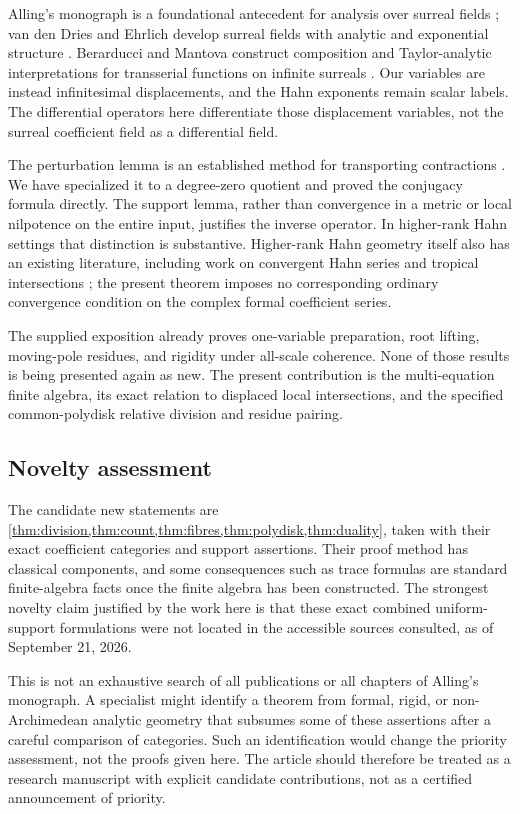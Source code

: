 \documentclass[11pt,letterpaper]{article}
\theoremstyle{definition}
\theoremstyle{remark}
\numberwithin{equation}{section}
\begin{document}
Alling's monograph is a foundational antecedent for analysis over surreal fields \cite{Alling}; van den Dries and Ehrlich develop surreal fields with analytic and exponential structure \cite{vdDE}. Berarducci and Mantova construct composition and Taylor-analytic interpretations for transserial functions on infinite surreals \cite{BM}. Our variables are instead infinitesimal displacements, and the Hahn exponents remain scalar labels. The differential operators here differentiate those displacement variables, not the surreal coefficient field as a differential field.

The perturbation lemma is an established method for transporting contractions \cite{Crainic}. We have specialized it to a degree-zero quotient and proved the conjugacy formula directly. The support lemma, rather than convergence in a metric or local nilpotence on the entire input, justifies the inverse operator. In higher-rank Hahn settings that distinction is substantive. Higher-rank Hahn geometry itself also has an existing literature, including work on convergent Hahn series and tropical intersections \cite{JoswigSmith}; the present theorem imposes no corresponding ordinary convergence condition on the complex formal coefficient series.

The supplied exposition \cite{Prior} already proves one-variable preparation, root lifting, moving-pole residues, and rigidity under all-scale coherence. None of those results is being presented again as new. The present contribution is the multi-equation finite algebra, its exact relation to displaced local intersections, and the specified common-polydisk relative division and residue pairing.

\subsection{Novelty assessment}
The candidate new statements are \cref{thm:division,thm:count,thm:fibres,thm:polydisk,thm:duality}, taken with their exact coefficient categories and support assertions. Their proof method has classical components, and some consequences such as trace formulas are standard finite-algebra facts once the finite algebra has been constructed. The strongest novelty claim justified by the work here is that these exact combined uniform-support formulations were not located in the accessible sources consulted, as of September 21, 2026.

This is not an exhaustive search of all publications or all chapters of Alling's monograph. A specialist might identify a theorem from formal, rigid, or non-Archimedean analytic geometry that subsumes some of these assertions after a careful comparison of categories. Such an identification would change the priority assessment, not the proofs given here. The article should therefore be treated as a research manuscript with explicit candidate contributions, not as a certified announcement of priority.
\end{document}
